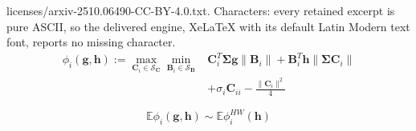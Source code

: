 \documentclass[10pt,a4paper]{amsart}
\newcommand{\bB}{\mathbf{B}}
\newcommand{\bC}{\mathbf{C}}
\newcommand{\bbE}{\mathbb{E}}
\newcommand{\calS}{\mathcal{S}}
\begin{document}
licenses/arxiv-2510.06490-CC-BY-4.0.txt. Characters: every retained excerpt is pure ASCII, so the delivered engine, XeLaTeX with its default Latin Modern text font, reports no missing character.
\begin{align}
    \phi_i(\mathbf{g}, \mathbf{h}) :=  \max_{\mathbf{C}_i \in \calS_{\bC}} \min_{\mathbf{B}_i \in \calS_{\bB}} & \mathbf{C}_i^T \boldsymbol{\Sigma} \mathbf{g} \|\mathbf{B}_i\|   + \mathbf{B}_i^T \mathbf{h}\|\boldsymbol{\Sigma}\mathbf{C}_i\| \nonumber \\
    & + \sigma_i\mathbf{C}_{ii}- \frac{\|\mathbf{C}_i\|^2}{4} \label{eq: PO_AO}
\end{align}

\begin{lemma}\label{lm: HW_bound}
$$\mathbb{E} \phi_i(\mathbf{g}, \mathbf{h})   \sim \bbE \phi^{HW}_i(\mathbf{h}) $$
\end{lemma}
\end{document}
